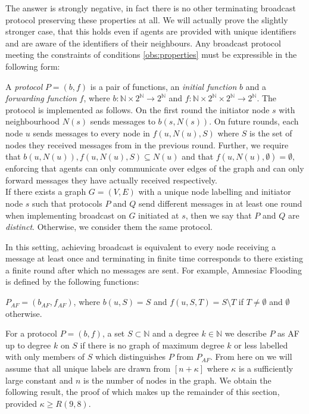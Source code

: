 The answer is strongly negative, in fact there is no other terminating broadcast protocol preserving these properties at all. We will actually prove the slightly stronger case, that this holds even if agents are provided with unique identifiers and are aware of the identifiers of their neighbours. Any broadcast protocol meeting the constraints of conditions \ref{obs:properties} must be expressible in the following form:
\begin{definition}
\label{def: functions}
    A \emph{protocol} $P=(b,f)$ is a pair of functions, an \emph{initial function} $b$ and a \emph{forwarding function} $f$, where $b:\mathbb{N}\times 2^{\mathbb{N}}\to 2^{\mathbb{N}}$ and $f:\mathbb{N}\times 2^{\mathbb{N}}\times 2^\mathbb{N}\to 2^\mathbb{N}$. 
    The protocol is implemented as follows. On the first round the initiator node $s$ with neighbourhood $N(s)$ sends messages to $b(s,N(s))$.
    On future rounds, each node $u$ sends messages to every node in $f(u,N(u), S)$ where $S$ is the set of nodes they received messages from in the previous round.
    Further, we require that $b(u,N(u)), f(u,N(u),S)\subseteq N(u)$ and that $f(u,N(u),\emptyset)=\emptyset$, enforcing that agents can only communicate over edges of the graph and can only forward messages they have actually received respectively.\\
    If there exists a graph $G=(V,E)$ with a unique node labelling and initiator node $s$ such that protocols $P$ and $Q$ send different messages in at least one round when implementing broadcast on $G$ initiated at $s$, then we say that $P$ and $Q$ are \emph{distinct}.
    Otherwise, we consider them the same protocol.
\end{definition}
In this setting, achieving broadcast is equivalent to every node receiving a message at least once and terminating in finite time corresponds to there existing a finite round after which no messages are sent.
For example, Amnesiac Flooding is defined by the following functions:
\begin{definition}
    $P_{AF}=(b_{AF},f_{AF})$, where $b(u,S)=S$ and $f(u,S,T)=S\setminus T$ if $T\neq \emptyset$ and $\emptyset$ otherwise.
\end{definition}
For a protocol $P=(b,f)$, a set $S \subset \mathbb{N}$ and a degree $k\in \mathbb{N}$ we describe $P$ as AF up to degree $k$ on $S$ if there is no graph of maximum degree $k$ or less labelled with only members of $S$ which distinguishes $P$ from $P_{AF}$.
From here on we will assume that all unique labels are drawn from $[n+\kappa]$ where $\kappa$ is a sufficiently large constant and $n$ is the number of nodes in the graph. We obtain the following result, the proof of which makes up the remainder of this section, provided $\kappa\geq R(9,8)$.
